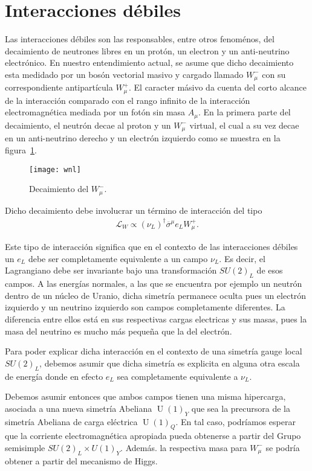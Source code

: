 \section{Interacciones débiles}
\begin{frame}
Las interacciones débiles son las responsables, entre otros fenoménos,
del decaimiento de neutrones libres en un protón, un electron y un
anti-neutrino electrónico. En nuestro entendimiento actual, se asume
que dicho decaimiento esta medidado por un bosón vectorial masivo y
cargado llamado $W^-_{\mu}$ con su correspondiente antipartícula
$W^{+}_{\mu}$. El caracter másivo da cuenta del corto alcance de la
interacción comparado con el rango infinito de la
interacción electromagnética mediada por un fotón sin masa
$A_{\mu}$. En la primera parte del decaimiento, el neutrón decae al
proton y un $W^{-}_{\mu}$ virtual, el cual a su vez decae en un
anti-neutrino derecho y un electrón izquierdo como se muestra en la
figura~\ref{fig:wnl}.

\begin{figure}
  \centering
  \texttt{[image: wnl]}
  \caption{Decaimiento del $W_\mu^-$.}
  \label{fig:wnl}
\end{figure}

Dicho decaimiento debe involucrar un término de interacción del tipo
\begin{align}
  \mathcal{L}_{W}\propto \left( \nu_L \right)^{\dagger}\overline{\sigma}^{\mu} e_L W_{\mu}^{+}.
\end{align}



Este tipo de interacción significa que en el contexto de las interacciones débiles un $e_L$ debe ser completamente
equivalente a un campo $\nu_L$. Es decir, el Lagrangiano debe ser
invariante bajo una transformación $SU(2)_L$ de esos campos. A las energías normales, a las que se encuentra por ejemplo un neutrón dentro de un núcleo de Uranio, dicha simetría permanece oculta pues un electrón izquierdo y un neutrino izquierdo son campos completamente diferentes.
La
diferencia entre ellos está en sus respectivas cargas electricas y sus
masas, pues la masa del neutrino es mucho más pequeña que la del electrón. 

Para poder explicar dicha interacción en el contexto de una simetría gauge local $SU(2)_L$, debemos asumir que dicha simetría es explicita en alguna otra escala de energía donde en efecto  $e_L$ sea completamente
equivalente a $\nu_L$.

Debemos asumir entonces que ambos campos tienen una misma hipercarga,
asociada a una nueva simetría Abeliana $\operatorname{U}(1)_Y$ que sea la precursora de la simetría Abeliana de carga eléctrica $\operatorname{U}(1)_Q$. En tal caso, podríamos esperar que
la corriente electromagnética apropiada pueda obtenerse a partir del
Grupo semisimple $SU(2)_L\times U(1)_Y$. Además. la respectiva masa para $W_{\mu}^{-}$
se podría obtener a partir del mecanismo de Higgs.


\end{frame}
